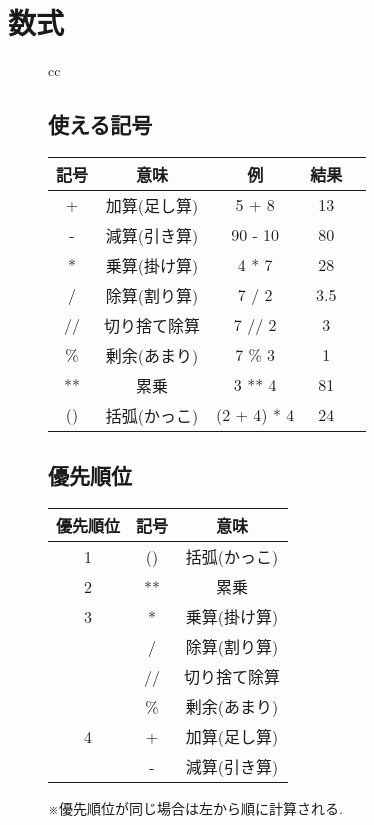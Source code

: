 \documentclass{jsarticle}
\begin{document}
\section{数式} \vspace{-5mm}
\begin{figure}[ht]
	\begin{tabular}{cc}
		\begin{minipage}{.6\textwidth}
			\subsection{使える記号} \vspace{-5mm}
			\begin{tabular}[t]{|c|c|c|c|c|}
				\hline
				記号 & 意味         & 例          & 結果 \\
				\hline \hline
				+    & 加算(足し算) & 5 + 8       & 13   \\ \hline
				-    & 減算(引き算) & 90 - 10     & 80   \\ \hline
				*    & 乗算(掛け算) & 4 * 7       & 28   \\ \hline
				/    & 除算(割り算) & 7 / 2       & 3.5  \\ \hline
				//   & 切り捨て除算 & 7 // 2      & 3    \\ \hline
				\%   & 剰余(あまり) & 7 \% 3      & 1    \\ \hline
				**   & 累乗         & 3 ** 4      & 81   \\ \hline
				()   & 括弧(かっこ) & (2 + 4) * 4 & 24   \\ \hline
			\end{tabular}
		\end{minipage}
		\hspace{-10mm}
		\begin{minipage}{.5\textwidth}
			\subsection{優先順位} \vspace{-4mm}
			\begin{tabular}[t]{|c|c|c|}
				\hline
				優先順位 & 記号 & 意味         \\
				\hline \hline
				1        & ()   & 括弧(かっこ) \\ \hline
				2        & **   & 累乗         \\ \hline
				3        & *    & 乗算(掛け算) \\ \hline
				         & /    & 除算(割り算) \\ \hline
				         & //   & 切り捨て除算 \\ \hline
				         & \%   & 剰余(あまり) \\ \hline
				4        & +    & 加算(足し算) \\ \hline
				         & -    & 減算(引き算) \\ \hline
			\end{tabular}
			\par
			※優先順位が同じ場合は左から順に計算される.
		\end{minipage}
	\end{tabular}
\end{figure}
\end{document}
